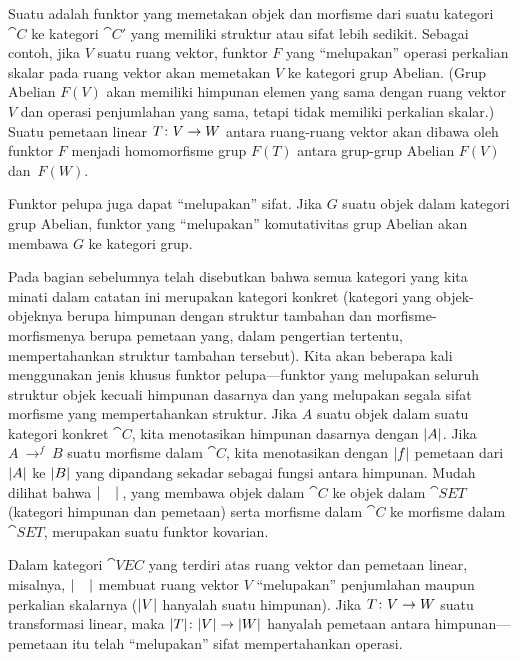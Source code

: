 \begin{exam}\label{functors005exam} Suatu
 adalah funktor yang memetakan objek dan morfisme dari suatu kategori $\cat
C$ ke kategori $\cat C'$ yang memiliki struktur atau sifat lebih sedikit. Sebagai contoh, jika $V$
suatu ruang vektor, funktor $F$ yang ``melupakan'' operasi perkalian skalar
pada ruang vektor akan memetakan $V$ ke kategori grup Abelian. (Grup
Abelian $F(V)$ akan memiliki himpunan elemen yang sama dengan ruang vektor $V$ dan
operasi penjumlahan yang sama, tetapi tidak memiliki perkalian skalar.) Suatu pemetaan linear
$T\colon V \rightarrow W$ antara ruang-ruang vektor akan dibawa oleh funktor $F$ menjadi homomorfisme
grup $F(T)$ antara grup-grup Abelian $F(V)$ dan~$F(W)$.

Funktor pelupa juga dapat ``melupakan'' sifat. Jika $G$ suatu objek dalam
kategori grup Abelian, funktor yang ``melupakan'' komutativitas grup Abelian
akan membawa $G$ ke kategori grup.

Pada bagian sebelumnya telah disebutkan bahwa semua kategori yang kita minati dalam
catatan ini merupakan kategori konkret (kategori yang objek-objeknya berupa himpunan dengan struktur
tambahan dan morfisme-morfismenya berupa pemetaan yang, dalam pengertian tertentu, mempertahankan
struktur tambahan tersebut). Kita akan beberapa kali menggunakan jenis khusus funktor
pelupa---funktor yang melupakan seluruh struktur objek kecuali himpunan dasarnya dan yang
melupakan segala sifat morfisme yang mempertahankan struktur. Jika $A$ suatu
objek dalam suatu kategori konkret $\cat C$, kita menotasikan
himpunan dasarnya dengan $\lvert A\rvert$. Jika \mbox{$A~\to^f~B$} suatu morfisme dalam $\cat C$, kita
menotasikan dengan $\lvert f\rvert$ pemetaan dari $\lvert A\rvert$ ke $\lvert B\rvert$ yang dipandang sekadar sebagai fungsi
antara himpunan. Mudah dilihat bahwa $\lvert\hphantom{M}\rvert$\,, yang membawa objek dalam
$\cat C$ ke objek dalam $\cat{SET}$ (kategori himpunan dan pemetaan) serta morfisme dalam $\cat
C$ ke morfisme dalam $\cat{SET}$, merupakan suatu funktor kovarian.

Dalam kategori $\cat{VEC}$ yang terdiri atas ruang vektor dan pemetaan linear, misalnya,
$\lvert\hphantom{M}\rvert$ membuat ruang vektor $V$ ``melupakan'' penjumlahan maupun
perkalian skalarnya ($\lvert V\rvert$ hanyalah suatu himpunan). Jika $T\colon V \rightarrow W$ suatu transformasi
linear, maka $\lvert T\rvert\colon \lvert V\rvert \rightarrow \lvert W\rvert$ hanyalah pemetaan antara himpunan---pemetaan itu telah
``melupakan'' sifat mempertahankan operasi.
\end{exam}


